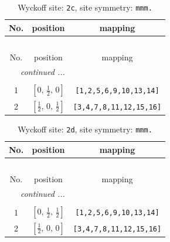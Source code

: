 \documentclass[fleqn,8pt]{jsarticle}
\begin{document}
\renewcommand{\arraystretch}{1.2}
\begin{longtable}{ccc}
\caption{Wyckoff site: {\tt 2c}, site symmetry: {\tt mmm.}}
 \\
 \hline \hline
No. & position & mapping \\ \hline \endfirsthead

\multicolumn{2}{l}{\tablename\ \thetable{}} \\
 \hline \hline
No. & position & mapping \\ \hline \endhead

 \hline \hline
\multicolumn{2}{r}{\footnotesize\it continued ...} \\ \endfoot

 \hline \hline
\multicolumn{2}{r}{} \\ \endlastfoot

1 & $\left[ 0,\, \frac{1}{2},\, 0 \right]$ & {\tt [1,2,5,6,9,10,13,14]} \\ \hline
2 & $\left[ \frac{1}{2},\, 0,\, \frac{1}{2} \right]$ & {\tt [3,4,7,8,11,12,15,16]} \\
\end{longtable}
\renewcommand{\arraystretch}{1.2}
\begin{longtable}{ccc}
\caption{Wyckoff site: {\tt 2d}, site symmetry: {\tt mmm.}}
 \\
 \hline \hline
No. & position & mapping \\ \hline \endfirsthead

\multicolumn{2}{l}{\tablename\ \thetable{}} \\
 \hline \hline
No. & position & mapping \\ \hline \endhead

 \hline \hline
\multicolumn{2}{r}{\footnotesize\it continued ...} \\ \endfoot

 \hline \hline
\multicolumn{2}{r}{} \\ \endlastfoot

1 & $\left[ 0,\, \frac{1}{2},\, \frac{1}{2} \right]$ & {\tt [1,2,5,6,9,10,13,14]} \\ \hline
2 & $\left[ \frac{1}{2},\, 0,\, 0 \right]$ & {\tt [3,4,7,8,11,12,15,16]} \\
\end{longtable}
\renewcommand{\arraystretch}{1.2}
\end{document}
